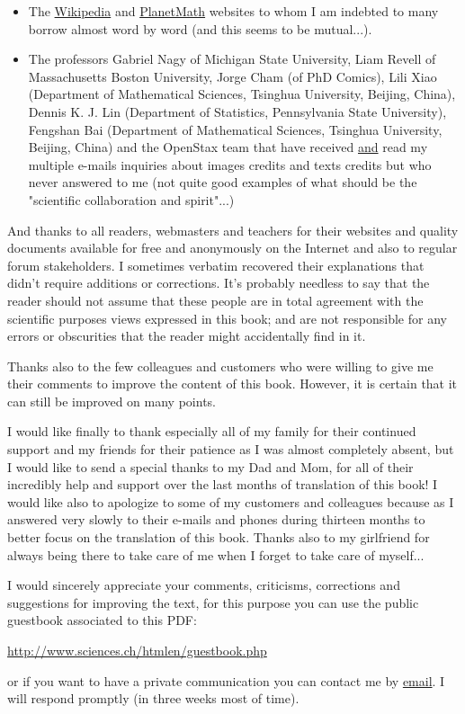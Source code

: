 \begin{itemize}
		\item The \href{http://www.wikipedia.com}{{\color{blue} Wikipedia}} and \href{http://www.planetmath.com}{{\color{blue} PlanetMath}} websites to whom I am indebted to many borrow almost word by word (and this seems to be mutual...).
		
		\item The professors Gabriel Nagy of Michigan State University, Liam Revell of Massachusetts Boston University, Jorge Cham (of PhD Comics), Lili Xiao (Department of Mathematical Sciences, Tsinghua University, Beijing, China), Dennis K. J. Lin (Department of Statistics, Pennsylvania State University), Fengshan Bai (Department of Mathematical Sciences, Tsinghua University, Beijing, China) and the OpenStax team that have received \underline{and} read my multiple e-mails inquiries about images credits and texts credits but who never answered to me (not quite good examples of what should be the "scientific collaboration and spirit"...)
	\end{itemize}
	
	And thanks to all readers, webmasters and teachers for their websites and quality documents available for free and anonymously on the Internet and also to regular forum stakeholders. I sometimes verbatim recovered their explanations that didn't require additions or corrections. It's probably needless to say that the reader should not assume that these people are in total agreement with the scientific purposes views expressed in this book; and are not responsible for any errors or obscurities that the reader might accidentally find in it.
	
	Thanks also to the few colleagues and customers who were willing to give me their comments to improve the content of this book. However, it is certain that it can still be improved on many points.
	
	I would like finally to thank especially all of my family for their continued support and my friends for their patience as I was almost completely absent, but I would like to send a special thanks to my Dad and Mom, for all of their incredibly help and support over the last months of translation of this book! I would like also to apologize to some of my customers and colleagues because as I answered very slowly to their e-mails and phones during thirteen months to better focus on the translation of this book. Thanks also to my girlfriend for always being there to take care of me when I forget to take care of myself...
	
	I would sincerely appreciate your comments, criticisms, corrections and suggestions for improving the text, for this purpose you can use the public guestbook associated to this PDF:
	\begin{center}
	\url{http://www.sciences.ch/htmlen/guestbook.php}
	\end{center}
	or if you want to have a private communication you can contact me by {\href{mailto:info@sciences.ch}{{\color{blue}email}}}. I will respond promptly (in three weeks most of time).
